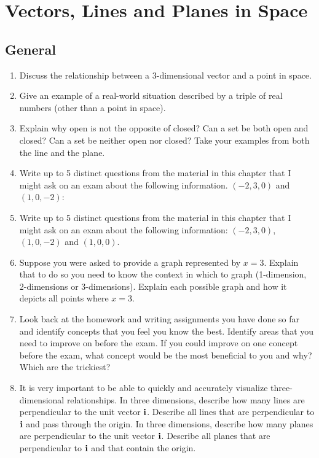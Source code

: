 




\chapter{Vectors, Lines and Planes in Space}

\label{sec:VectorsLinesAndPlanesInSpace}


\section{General}

\begin{enumerate}
\item Discuss the relationship between a 3-dimensional vector and a point in space.  \cite{EP}
\item Give an example of a real-world situation described by a triple of real numbers (other than a point in space).  \cite{EP}
\item Explain why open is not the opposite of closed?  Can a set be both open and closed?  Can a set be neither open nor closed?  Take your examples from both the line and the plane.
\item Write up to 5 distinct questions from the material in this chapter that I might ask on an exam about the following information.
$(-2, 3, 0)$ and $(1, 0, -2)$:
\item Write up to 5 distinct questions from the material in this chapter that I might ask on an exam about the following information:
$(-2, 3, 0)$, $(1, 0, -2)$ and $(1, 0, 0)$.
\item Suppose you were asked to provide a graph represented by $x = 3$.  Explain that to do so you need to know the context in which to graph (1-dimension, 2-dimensions or 3-dimensions).  Explain each possible graph and how it depicts all points where $x = 3$.
\item Look back at the homework and writing assignments you have done so far and identify concepts that you feel you know the best.  Identify areas that you need to improve on before the exam.  If you could improve on one concept before the exam, what concept would be the most beneficial to you and why? Which are the trickiest?
\item It is very important to be able to quickly and accurately visualize three-dimensional relationships.  In three dimensions, describe how many lines are perpendicular to the unit vector $\bf{i}$.  Describe all lines that are perpendicular to $\bf{i}$ and pass through the origin.  In three dimensions, describe how many planes are perpendicular to the unit vector $\bf{i}$.  Describe all planes that are perpendicular to $\bf{i}$ and that contain the origin.  \cite{SM}
\end{enumerate}

